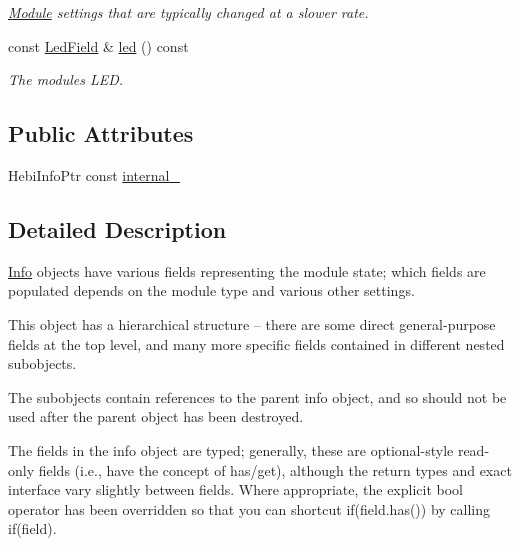 \begin{DoxyCompactItemize}
\begin{DoxyCompactList}\small\item\em \hyperlink{classhebi_1_1Module}{Module} settings that are typically changed at a slower rate. \end{DoxyCompactList}\item 
const \hyperlink{classhebi_1_1Info_1_1LedField}{Led\+Field} \& \hyperlink{classhebi_1_1Info_ae66029ee0d8461913ad373258af8a21f}{led} () const \hypertarget{classhebi_1_1Info_ae66029ee0d8461913ad373258af8a21f}{}\label{classhebi_1_1Info_ae66029ee0d8461913ad373258af8a21f}

\begin{DoxyCompactList}\small\item\em The module\textquotesingle{}s L\+ED. \end{DoxyCompactList}\end{DoxyCompactItemize}
\subsection*{Public Attributes}
\begin{DoxyCompactItemize}
\item 
Hebi\+Info\+Ptr const \hyperlink{classhebi_1_1Info_aedc02a37757c7fcbd53a8069eeffcc73}{internal\+\_\+}
\end{DoxyCompactItemize}


\subsection{Detailed Description}
\hyperlink{classhebi_1_1Info}{Info} objects have various fields representing the module state; which fields are populated depends on the module type and various other settings. 

This object has a hierarchical structure -- there are some direct general-\/purpose fields at the top level, and many more specific fields contained in different nested subobjects.

The subobjects contain references to the parent info object, and so should not be used after the parent object has been destroyed.

The fields in the info object are typed; generally, these are optional-\/style read-\/only fields (i.\+e., have the concept of has/get), although the return types and exact interface vary slightly between fields. Where appropriate, the explicit bool operator has been overridden so that you can shortcut {\ttfamily if}(field.\+has()) by calling {\ttfamily if(field)}.

